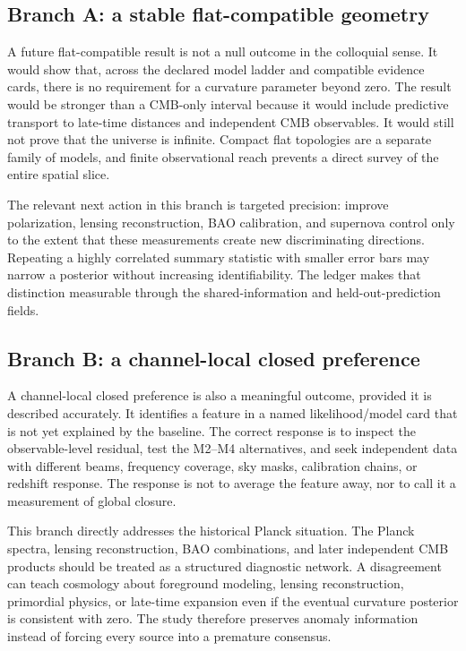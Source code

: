\documentclass[conference]{IEEEtran}
\begin{document}
\subsection{Branch A: a stable flat-compatible geometry}

A future flat-compatible result is not a null outcome in the colloquial sense. It would show that, across the declared model ladder and compatible evidence cards, there is no requirement for a curvature parameter beyond zero. The result would be stronger than a CMB-only interval because it would include predictive transport to late-time distances and independent CMB observables. It would still not prove that the universe is infinite. Compact flat topologies are a separate family of models, and finite observational reach prevents a direct survey of the entire spatial slice.

The relevant next action in this branch is targeted precision: improve polarization, lensing reconstruction, BAO calibration, and supernova control only to the extent that these measurements create new discriminating directions. Repeating a highly correlated summary statistic with smaller error bars may narrow a posterior without increasing identifiability. The ledger makes that distinction measurable through the shared-information and held-out-prediction fields.

\subsection{Branch B: a channel-local closed preference}

A channel-local closed preference is also a meaningful outcome, provided it is described accurately. It identifies a feature in a named likelihood/model card that is not yet explained by the baseline. The correct response is to inspect the observable-level residual, test the M2--M4 alternatives, and seek independent data with different beams, frequency coverage, sky masks, calibration chains, or redshift response. The response is not to average the feature away, nor to call it a measurement of global closure.

This branch directly addresses the historical Planck situation. The Planck spectra, lensing reconstruction, BAO combinations, and later independent CMB products should be treated as a structured diagnostic network. A disagreement can teach cosmology about foreground modeling, lensing reconstruction, primordial physics, or late-time expansion even if the eventual curvature posterior is consistent with zero. The study therefore preserves anomaly information instead of forcing every source into a premature consensus.
\end{document}
